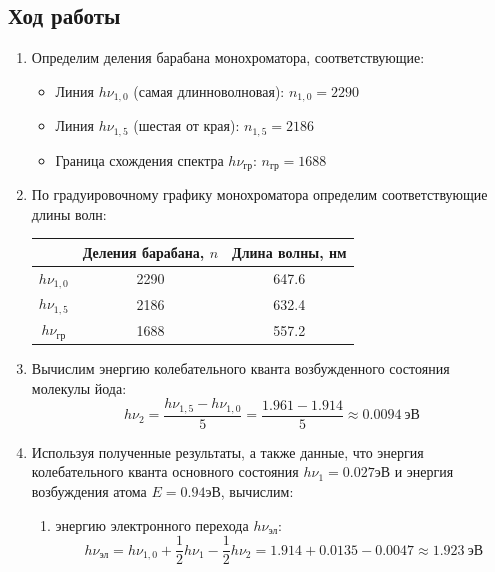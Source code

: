 \documentclass[a4paper,12pt]{article}
\begin{document}
\subsection{Ход работы}

\begin{enumerate}
    \item Определим деления барабана монохроматора, соответствующие:
    \begin{itemize}
        \item Линия $h\nu_{1,0}$ (самая длинноволновая): $n_{1,0} = 2290$
        \item Линия $h\nu_{1,5}$ (шестая от края): $n_{1,5} = 2186$
        \item Граница схождения спектра $h\nu_{\text{гр}}$: $n_{\text{гр}} = 1688$
    \end{itemize}

    \item По градуировочному графику монохроматора определим соответствующие длины волн:
    
    \begin{table}[h!]
    \centering
    \begin{tabular}{||c|c|c||}
    \hline
     & Деления барабана, $n$ & Длина волны, нм \\
    \hline
    \hline
    $h\nu_{1,0}$ & 2290 & 647.6 \\
    \hline
    $h\nu_{1,5}$ & 2186 & 632.4 \\
    \hline
    $h\nu_{\text{гр}}$ & 1688 & 557.2 \\
    \hline
    \end{tabular}
    \end{table}

    \item Вычислим энергию колебательного кванта возбужденного состояния молекулы йода:
    $$
    h\nu_2 = \frac{h\nu_{1,5} - h\nu_{1,0}}{5} = \frac{1.961 - 1.914}{5} \approx 0.0094\ \text{эВ}
    $$

    \item Используя полученные результаты, а также данные, что энергия колебательного кванта основного состояния $h\nu_1=0.027$эВ и энергия возбуждения атома $E=0.94$эВ, вычислим:
    \begin{enumerate}
        \item энергию электронного перехода $h\nu_\text{эл}$:
        $$
        h\nu_{\text{эл}} = h\nu_{1,0} + \frac{1}{2}h\nu_1 - \frac{1}{2}h\nu_2 = 1.914 + 0.0135 - 0.0047 \approx 1.923\ \text{эВ}
        $$


\end{enumerate}
\end{enumerate}
\end{document}

